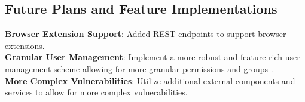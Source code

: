 \subsection{Future Plans and Feature Implementations}
\noindent\textbf{Browser Extension Support}: Added REST endpoints to support browser extensions.\\
\noindent\textbf{Granular User Management}: Implement a more robust and feature rich user management scheme allowing for more granular permissions and groups .\\
\noindent\textbf{More Complex Vulnerabilities}: Utilize additional external components and services to allow for more complex vulnerabilities.\\

